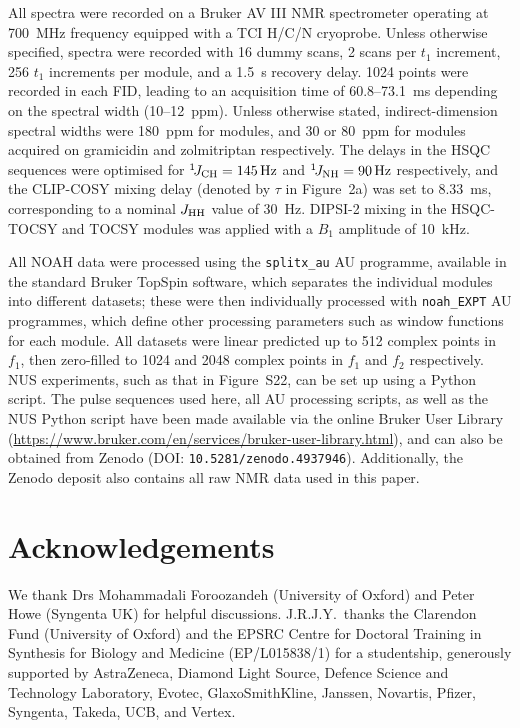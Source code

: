 \documentclass[final,twocolumn]{elsarticle}
\newcommand*{\carbon}{\ce{^{13}C}}
\newcommand*{\proton}{\ce{^{1}H}}
\newcommand*{\nitrogen}{\ce{^{15}N}}
\newcommand*{\onejch}{{}^{1}\!J_{\ce{CH}}}
\newcommand*{\onejnh}{{}^{1}\!J_{\ce{NH}}}
\newcommand*{\jhh}{J_{\ce{HH}}}
\begin{document}
All spectra were recorded on a Bruker AV III NMR spectrometer operating at \SI{700}{\MHz} \proton{} frequency equipped with a TCI H/C/N cryoprobe.
Unless otherwise specified, spectra were recorded with 16 dummy scans, 2 scans per $t_1$ increment, 256 $t_1$ increments per module, and a \SI{1.5}{\s} recovery delay.
1024 points were recorded in each FID, leading to an acquisition time of 60.8--\SI{73.1}{\ms} depending on the \proton{} spectral width (10--\SI{12}{ppm}).
Unless otherwise stated, indirect-dimension spectral widths were \SI{180}{ppm} for \carbon{} modules, and 30 or \SI{80}{ppm} for \nitrogen{} modules acquired on gramicidin and zolmitriptan respectively.
The delays in the HSQC sequences were optimised for $\onejch = \SI{145}{\Hz}$ and $\onejnh = \SI{90}{\Hz}$ respectively, and the CLIP-COSY mixing delay (denoted by $\tau$ in Figure~2a) was set to \SI{8.33}{\ms}, corresponding to a nominal $\jhh$ value of \SI{30}{Hz}.
DIPSI-2 mixing in the HSQC-TOCSY and TOCSY modules was applied with a $B_1$ amplitude of \SI{10}{\kHz}.

All NOAH data were processed using the \texttt{splitx\_au} AU programme, available in the standard Bruker TopSpin software, which separates the individual modules into different datasets; these were then individually processed with \texttt{noah\_EXPT} AU programmes, which define other processing parameters such as window functions for each module.
All datasets were linear predicted up to 512 complex points in $f_1$, then zero-filled to 1024 and 2048 complex points in $f_1$ and $f_2$ respectively.
NUS experiments, such as that in Figure~S22, can be set up using a Python script.
The pulse sequences used here, all AU processing scripts, as well as the NUS Python script have been made available via the online Bruker User Library (\url{https://www.bruker.com/en/services/bruker-user-library.html}), and can also be obtained from Zenodo (DOI: \texttt{10.5281/zenodo.4937946}).
Additionally, the Zenodo deposit also contains all raw NMR data used in this paper.
\section*{Acknowledgements}
We thank Drs Mohammadali Foroozandeh (University of Oxford) and Peter Howe (Syngenta UK) for helpful discussions.
J.R.J.Y.\ thanks the Clarendon Fund (University of Oxford) and the EPSRC Centre for Doctoral Training in Synthesis for Biology and Medicine (EP/L015838/1) for a studentship, generously supported by AstraZeneca, Diamond Light Source, Defence Science and Technology Laboratory, Evotec, GlaxoSmithKline, Janssen, Novartis, Pfizer, Syngenta, Takeda, UCB, and Vertex.



\end{document}
